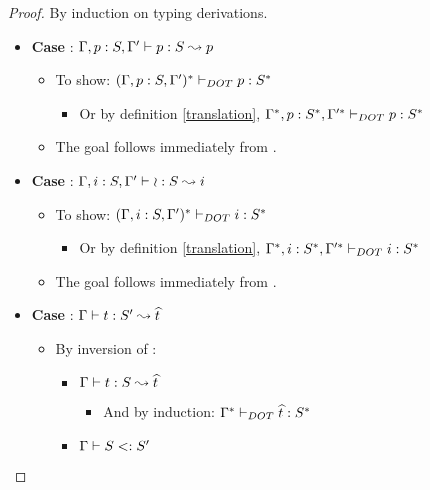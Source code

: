 \begin{proof}
    By induction on typing derivations.
    \begin{itemize}
        \item \textbf{Case} : $\Gamma, p: S, \Gamma' \vdash p: S \leadsto p$
        \begin{itemize}
            \item To show: $(\Gamma, p: S, \Gamma')^{*} \vdash_{DOT} p: S^{*}$
            \begin{itemize}
                \item Or by definition \ref{translation}, 
                    $\Gamma^{*}, p: S^{*},
                    \Gamma'^{*} \vdash_{DOT} p: S^{*}$
            \end{itemize}
            \item The goal follows immediately from .
        \end{itemize}
        \item \textbf{Case} :
            $\Gamma, i: S, \Gamma' \vdash \wr: S \leadsto i$
        \begin{itemize}
            \item To show: $(\Gamma, i: S, \Gamma')^{*} \vdash_{DOT} i: S^{*}$
            \begin{itemize}
                \item Or by definition \ref{translation}, 
                    $\Gamma^{*}, i: S^{*},
                    \Gamma'^{*} \vdash_{DOT} i: S^{*}$
            \end{itemize}
            \item The goal follows immediately from .
        \end{itemize}
        \item \textbf{Case} : $\Gamma \vdash t: S' \leadsto \widehat{t}$
        \begin{itemize}
            \item By inversion of :
            \begin{itemize}
                \item $\Gamma \vdash t: S \leadsto \widehat{t}$
                \begin{itemize}
                    \item And by induction:
                        $\Gamma^{*} \vdash_{DOT} \widehat{t}: S^{*}$
                \end{itemize}
                \item $\Gamma \vdash S <: S'$
                \begin{itemize}

\end{itemize}
\end{itemize}
\end{itemize}
\end{itemize}
\end{proof}
